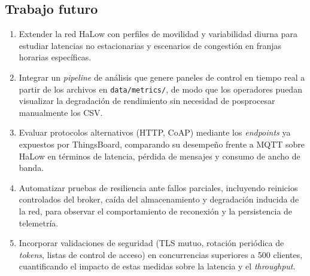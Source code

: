 \subsection{Trabajo futuro}
\begin{enumerate}
  \item Extender la red HaLow con perfiles de movilidad y variabilidad diurna para estudiar latencias no estacionarias y escenarios de congesti\'on en franjas horarias espec\'ificas.
  \item Integrar un \emph{pipeline} de an\'alisis que genere paneles de control en tiempo real a partir de los archivos en \texttt{data/metrics/}, de modo que los operadores puedan visualizar la degradaci\'on de rendimiento sin necesidad de posprocesar manualmente los CSV.
  \item Evaluar protocolos alternativos (HTTP, CoAP) mediante los \emph{endpoints} ya expuestos por ThingsBoard, comparando su desempe\~no frente a MQTT sobre HaLow en t\'erminos de latencia, p\'erdida de mensajes y consumo de ancho de banda.
  \item Automatizar pruebas de resiliencia ante fallos parciales, incluyendo reinicios controlados del broker, ca\'ida del almacenamiento y degradaci\'on inducida de la red, para observar el comportamiento de reconexi\'on y la persistencia de telemetr\'ia.
  \item Incorporar validaciones de seguridad (TLS mutuo, rotaci\'on peri\'odica de \emph{tokens}, listas de control de acceso) en concurrencias superiores a \num{500} clientes, cuantificando el impacto de estas medidas sobre la latencia y el \emph{throughput}.
\end{enumerate}
